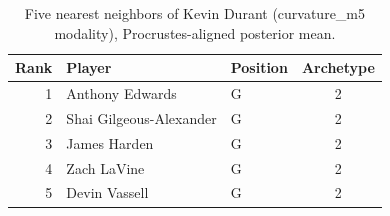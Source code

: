 \begin{table}[htbp]
  \centering\small
  \begin{tabular}{rllc}
    \toprule
    Rank & Player & Position & Archetype \\
    \midrule
    1 & Anthony Edwards & G & 2 \\
    2 & Shai Gilgeous-Alexander & G & 2 \\
    3 & James Harden & G & 2 \\
    4 & Zach LaVine & G & 2 \\
    5 & Devin Vassell & G & 2 \\
    \bottomrule
  \end{tabular}
  \caption{Five nearest neighbors of Kevin Durant (curvature_m5 modality), Procrustes-aligned posterior mean.}
  \label{tab:Kevin_Durant_neighbors_curvature_m5}
\end{table}

